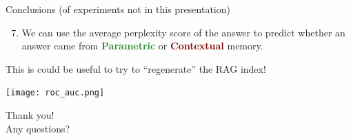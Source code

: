 \documentclass[10pt]{beamer}
\newcommand{\Parametric}{\textbf{\textcolor{ForestGreen}{Parametric}}}
\newcommand{\Contextual}{\textbf{\textcolor{Maroon}{Contextual}}}
\begin{document}
\begin{frame}{Conclusions (of experiments not in this presentation)}
	\begin{enumerate}
		\setcounter{enumi}{6}
		\item We can use the average perplexity score of the answer to predict whether an answer came from \Parametric{} or \Contextual{} memory.
	\end{enumerate}


	\vfill{}

	This is could be useful to try to ``regenerate'' the RAG index!

	\vfill{}

	\centering
	\texttt{[image: roc\_auc.png]}
\end{frame}

\begin{frame}{\phantom{a}}
	\centering
	\huge
	Thank you! \\[1em]

	Any questions?
\end{frame}
\end{document}
